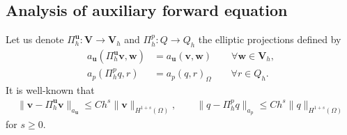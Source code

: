 \documentclass{amsart}
\begin{document}
\subsection{Analysis of auxiliary forward equation}
%
Let us denote $\Pi_h^{\boldsymbol{u}} : \boldsymbol{V} \to \boldsymbol{V}_h$ and $\Pi_h^{p}: Q \to Q_h$ the elliptic projections defined by 
%
\begin{align}
    \label{eq:elasticity-elliptic-projection}
    a_{\boldsymbol{u}} (\Pi_h^{\boldsymbol{u}} \boldsymbol{v}, \boldsymbol{w}) &=     a_{\boldsymbol{u}} ( \boldsymbol{v}, \boldsymbol{w}) \qquad \forall \boldsymbol{w} \in \boldsymbol{V}_h,
    \\
    \label{eq:poisson-elliptic-projection}
    a_p( \Pi_h^p q, r) &= a_p( q, r)_{\Omega} \qquad \forall r \in Q_h . 
\end{align}
%
It is well-known that 
%
\begin{align}
    \label{eq:elliptic-projection-approx}   
    \| \boldsymbol{v} - \Pi_h^{\boldsymbol{u}} \boldsymbol{v} \|_{a_{\boldsymbol{u}}} \le Ch^{s} \|\boldsymbol{v}\|_{H^{1+s}(\Omega)}, 
    \qquad 
    \| q - \Pi_h^{p} q \|_{a_{p}} \le Ch^{s} \|q\|_{H^{1+s}(\Omega)} 
\end{align}
%
for $s \ge 0$. 
%
\end{document}
